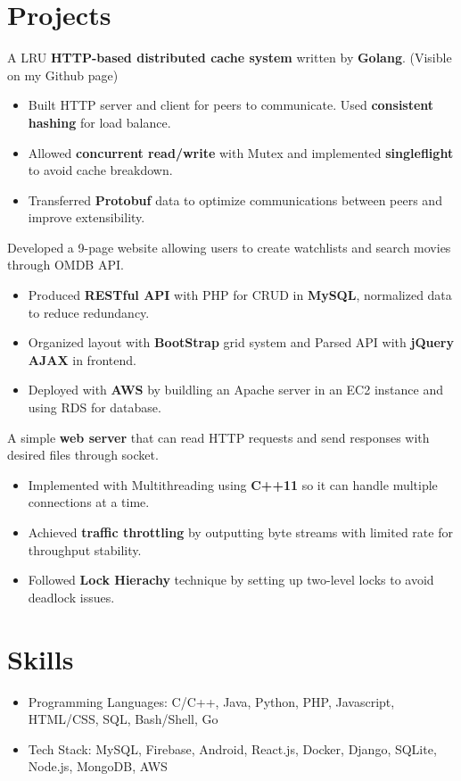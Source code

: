 \documentclass{resume}
\begin{document}
\section{Projects}
  A LRU \textbf{HTTP-based distributed cache system} written by \textbf{Golang}. (Visible on my Github page)
\begin{itemize}
  \item Built HTTP server and client for peers to communicate. Used \textbf{consistent hashing} for load balance.
  \item Allowed \textbf{concurrent read/write} with Mutex and implemented \textbf{singleflight} to avoid cache breakdown.
  \item Transferred \textbf{Protobuf} data to optimize communications between peers and improve extensibility.
\end{itemize}

  Developed a 9-page website allowing users to create watchlists and search movies through OMDB API.
\begin{itemize}
  \item Produced \textbf{RESTful API} with PHP for CRUD in \textbf{MySQL}, normalized data to reduce redundancy.
  \item Organized layout with \textbf{BootStrap} grid system and Parsed API with \textbf{jQuery AJAX} in frontend.
  \item Deployed with \textbf{AWS} by buildling an Apache server in an EC2 instance and using RDS for database.
\end{itemize}

  A simple \textbf{web server} that can read HTTP requests and send responses with desired files through socket.
\begin{itemize}
  \item Implemented with Multithreading using \textbf{C++11} so it can handle multiple connections at a time.
  \item Achieved \textbf{traffic throttling} by outputting byte streams with limited rate for throughput stability.
  \item Followed \textbf{Lock Hierachy} technique by setting up two-level locks to avoid deadlock issues.
\end{itemize}

\section{Skills}
\begin{itemize}[parsep=0.5ex]
  \item Programming Languages: C/C++, Java, Python, PHP, Javascript, HTML/CSS, SQL, Bash/Shell, Go
  \item Tech Stack: MySQL, Firebase, Android, React.js, Docker, Django, SQLite, Node.js, MongoDB, AWS
\end{itemize}
\end{document}
